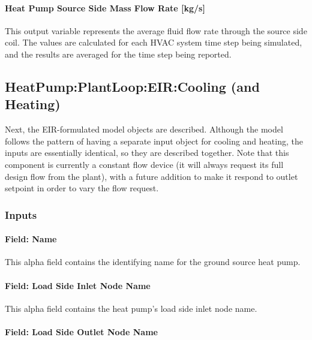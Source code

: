 \paragraph{Heat Pump Source Side Mass Flow Rate {[}kg/s{]}}\label{water-to-water-heat-pump-source-side-mass-flow-rate-kgs-1}

This output variable represents the average fluid flow rate through the source side coil. The values are calculated for each HVAC system time step being simulated, and the results are averaged for the time step being reported.

\subsection{HeatPump:PlantLoop:EIR:Cooling (and Heating)}\label{plhp_eir}

Next, the EIR-formulated model objects are described. Although the model follows the pattern of having a separate input object for cooling and heating, the inputs are essentially identical, so they are described together. Note that this component is currently a constant flow device (it will always request its full design flow from the plant), with a future addition to make it respond to outlet setpoint in order to vary the flow request.

\subsubsection{Inputs}\label{plhp_eir_inputs}

\paragraph{Field: Name}\label{plhp_eir_inputs_name}

This alpha field contains the identifying name for the ground source heat pump.

\paragraph{Field: Load Side Inlet Node Name}\label{plhp_eir_inputs_load_inlet_node}

This alpha field contains the heat pump's load side inlet node name.

\paragraph{Field: Load Side Outlet Node Name}\label{plhp_eir_inputs_load_outlet_node}

